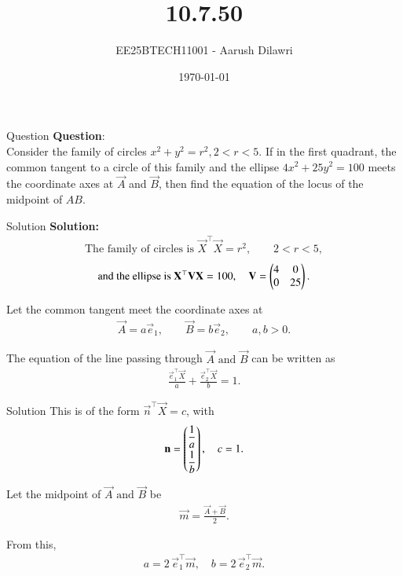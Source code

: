\documentclass{beamer}
\title{10.7.50}
\date{\today}
\author{EE25BTECH11001 - Aarush Dilawri}
\begin{document}
\frame{\titlepage}

\begin{frame}{Question}
\textbf{Question}:\\[6pt]
Consider the family of circles $x^2 + y^2 = r^2 , 2 < r < 5$. If in the first quadrant, the
common tangent to a circle of this family and the ellipse $4x^2 + 25y^2 = 100$ meets
the coordinate axes at $\vec{A}$ and $\vec{B}$, then find the equation of the locus of the midpoint of $AB$.
\end{frame}

\begin{frame}{Solution}
\textbf{Solution:}\\
\begin{align}
\text{The family of circles is } 
\vec{X}^\top\vec{X} = r^2,\qquad 2<r<5,
\end{align}
\begin{align}
\text{and the ellipse is } 
\mathbf{X}^\top\mathbf{V}\mathbf{X} = 100,\quad
\mathbf{V} = \begin{pmatrix}4 & 0 \\ 0 & 25\end{pmatrix}.
\end{align}

Let the common tangent meet the coordinate axes at 
\begin{align}
\vec{A} = a\vec{e}_1,\qquad \vec{B} = b\vec{e}_2,
\qquad a,b>0.
\end{align}

The equation of the line passing through $\vec{A} \text{ and } \vec{B}$ can be written as 
\begin{align}
\frac{\vec{e}_1^\top\vec{X}}{a}+\frac{\vec{e}_2^\top\vec{X}}{b}=1.
\end{align}
\end{frame}

\begin{frame}{Solution}
This is of the form  $\vec{n}^\top\vec{X}=c$, with 
\begin{align}
\mathbf{n} = \begin{pmatrix}\dfrac{1}{a}\\[6pt]\dfrac{1}{b}\end{pmatrix},
\quad c=1.
\end{align}

Let the midpoint of $\vec{A} \text{ and } \vec{B}$ be 
\begin{align}
\vec{m} = \frac{\vec{A}+\vec{B}}{2}.
\end{align}

From this,
\begin{align}
a = 2\,\vec{e}_1^\top\vec{m},\quad
b = 2\,\vec{e}_2^\top\vec{m}.
\end{align}
\end{frame}
\end{document}
